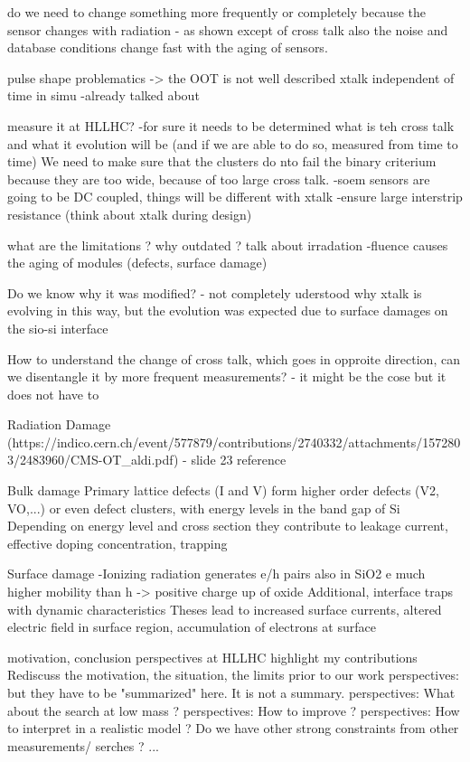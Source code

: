 do we need to change something more frequently or completely because the sensor changes with radiation
	- as shown except of cross talk also the noise and database conditions change fast with the aging of sensors.


pulse shape problematics -> the OOT is not well described
xtalk independent of time in simu
	-already talked about


measure it at HLLHC?
	-for sure it needs to be determined what is teh cross talk and what it evolution will be (and if we are able to do so, measured from time to time) We need to make sure that the clusters do nto fail the binary criterium because they are too wide, because of too large cross talk. 
	-soem sensors are going to be DC coupled, things will be different with xtalk
	-ensure large interstrip resistance (think about xtalk during design) 

what are the limitations ?
why outdated ? talk about irradation
	-fluence causes the aging of modules (defects, surface damage)

Do we know why it was modified?
	- not completely uderstood why xtalk is evolving in this way, but the evolution was expected due to surface damages on the sio-si interface

How to understand the change of cross talk, which goes in opproite direction, can we disentangle it by more frequent measurements?
	- it might be the cose but it does not have to

Radiation Damage (https://indico.cern.ch/event/577879/contributions/2740332/attachments/1572803/2483960/CMS-OT_aldi.pdf) - slide 23 reference

Bulk damage
	Primary lattice defects (I and V) form higher order defects (V2, VO,...) or even defect clusters, with energy levels in the band gap of Si
	Depending on energy level and cross section they contribute to leakage current, effective doping concentration, trapping

Surface damage
	-Ionizing radiation generates e/h pairs also in SiO2 
	e much higher mobility than h -> positive charge up of oxide
	Additional, interface traps with dynamic characteristics
	Theses lead to increased surface currents, altered electric field in surface region, accumulation of electrons at surface


motivation, conclusion
perspectives at HLLHC
highlight my contributions
Rediscuss the motivation, the situation, the limits prior to our work
perspectives: but they have to be "summarized" here. It is not a summary.
perspectives:	What about the search at low mass ?
perspectives:	How to improve ?
perspectives:	How to interpret in a realistic model ? Do we have other strong constraints from other measurements/ serches ? ...
